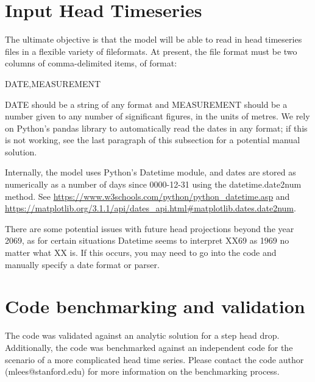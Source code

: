 \documentclass{article}
\begin{document}
\section{Input Head Timeseries}

The ultimate objective is that the model will be able to read in head timeseries files in a flexible variety of fileformats. At present, the file format must be two columns of comma-delimited items, of format:

DATE,MEASUREMENT

DATE should be a string of any format and MEASUREMENT should be a number given to any number of significant figures, in the units of metres. We rely on Python's pandas library to automatically read the dates in any format; if this is not working, see the last paragraph of this subsection for a potential manual solution.

Internally, the model uses Python's Datetime module, and dates are stored as numerically as a number of days since 0000-12-31 using the datetime.date2num method. See \url{https://www.w3schools.com/python/python_datetime.asp} and \url{https://matplotlib.org/3.1.1/api/dates_api.html\#matplotlib.dates.date2num}.

There are some potential issues with future head projections beyond the year 2069, as for certain situations Datetime seems to interpret XX69 as 1969 no matter what XX is. If this occurs, you may need to go into the code and manually specify a date format or parser.

\section{Code benchmarking and validation}

The code was validated against an analytic solution for a step head drop. Additionally, the code was benchmarked against an independent code for the scenario of a more complicated head time series. Please contact the code author (mlees@stanford.edu) for more information on the benchmarking process.



\end{document}

